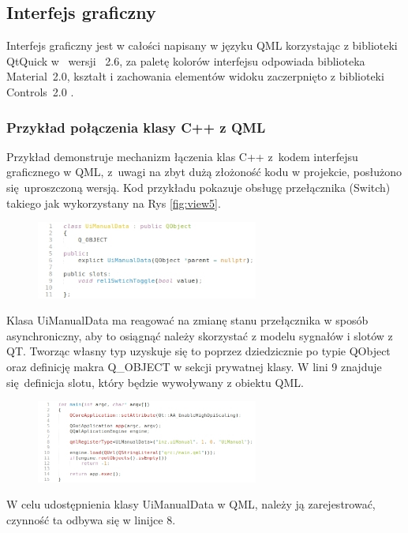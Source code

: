 \documentclass[12pt, eng, twoside, openany, final]{mgr}
\begin{document}
                \subsection{Interfejs graficzny}
                Interfejs graficzny jest w całości napisany w języku QML korzystając z biblioteki QtQuick w~ wersji~ 2.6\cite{qtQuick2.6}, za paletę kolorów interfejsu odpowiada biblioteka Material~2.0\cite{qtMaterial2}, kształt i zachowania elementów widoku zaczerpnięto z biblioteki Controls~2.0 \cite{qtControls2}. 
                
                \subsubsection{Przykład połączenia klasy C++ z QML}
                Przykład demonstruje mechanizm łączenia klas C++ z~kodem interfejsu graficznego w QML, z~uwagi na zbyt dużą złożoność kodu w projekcie, posłużono się uproszczoną wersją. Kod przykładu pokazuje obsługę przełącznika (Switch) takiego jak wykorzystany na Rys \ref{fig:view5}.
                    \begin{figure}[H]
                    \begin{center}
                        \includegraphics[width=0.65\textwidth]{code_class.jpg}
                    \end{center}
                    \end{figure}
\noindent                    Klasa UiManualData ma reagować na zmianę stanu przełącznika w sposób asynchroniczny, aby to osiągnąć należy skorzystać z modelu sygnałów i slotów z QT. Tworząc własny typ uzyskuje się to poprzez dziedzicznie po typie QObject oraz definicję makra Q\_OBJECT w sekcji prywatnej klasy. W lini 9 znajduje się definicja slotu, który będzie wywoływany z obiektu QML.
                    
                    \begin{figure}[H]
                    \begin{center}
                        \includegraphics[width=0.65\textwidth]{code_main.jpg}
                    \end{center}
                    \end{figure}
\noindent                    W celu udostępnienia klasy UiManualData w QML, należy ją zarejestrować, czynność ta odbywa się w linijce 8.
                    
\end{document}
